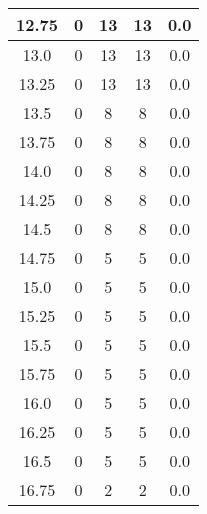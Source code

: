 \documentclass[letterpaper, 12pt]{article}
\begin{document}
\begin{longtable}{|c|c|c|c|c|}
\hline
12.75 & 0 & 13 & 13 & 0.0 \\
\hline
13.0 & 0 & 13 & 13 & 0.0 \\
\hline
13.25 & 0 & 13 & 13 & 0.0 \\
\hline
13.5 & 0 & 8 & 8 & 0.0 \\
\hline
13.75 & 0 & 8 & 8 & 0.0 \\
\hline
14.0 & 0 & 8 & 8 & 0.0 \\
\hline
14.25 & 0 & 8 & 8 & 0.0 \\
\hline
14.5 & 0 & 8 & 8 & 0.0 \\
\hline
14.75 & 0 & 5 & 5 & 0.0 \\
\hline
15.0 & 0 & 5 & 5 & 0.0 \\
\hline
15.25 & 0 & 5 & 5 & 0.0 \\
\hline
15.5 & 0 & 5 & 5 & 0.0 \\
\hline
15.75 & 0 & 5 & 5 & 0.0 \\
\hline
16.0 & 0 & 5 & 5 & 0.0 \\
\hline
16.25 & 0 & 5 & 5 & 0.0 \\
\hline
16.5 & 0 & 5 & 5 & 0.0 \\
\hline
16.75 & 0 & 2 & 2 & 0.0 \\
\hline
\end{longtable}
\end{document}
